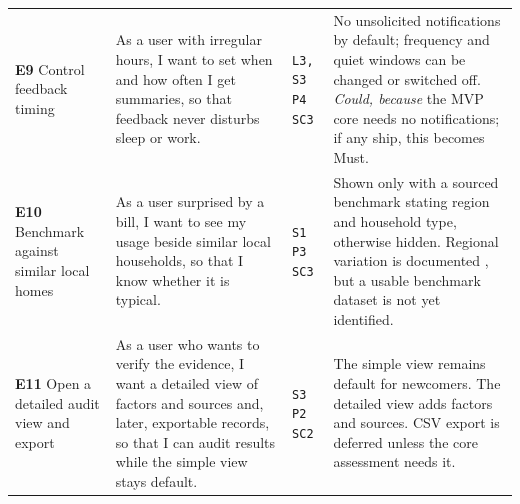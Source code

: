 \documentclass[12pt, a4paper]{article}
\begin{document}
{\begin{longtable}{|>{\raggedright\arraybackslash}p{2.6cm}|>{\raggedright\arraybackslash}p{5.1cm}|>{\raggedright\arraybackslash}p{3.0cm}|>{\raggedright\arraybackslash}p{4.9cm}|}
\rowcolor{cPlum}\multicolumn{4}{|l|}{\textcolor{white}{\textbf{COULD HAVE: depth and personalisation}}} \\
\hline
\textbf{E9} Control feedback timing &
As a user with irregular hours, I want to set when and how often I get summaries, so that feedback never disturbs sleep or work. &
\texttt{L3, S3} \newline \texttt{P4} \newline \texttt{SC3} &
No unsolicited notifications by default; frequency and quiet windows can be changed or switched off. \emph{Could, because} the MVP core needs no notifications; if any ship, this becomes Must. \\
\hline
\textbf{E10} Benchmark against similar local homes &
As a user surprised by a bill, I want to see my usage beside similar local households, so that I know whether it is typical. &
\texttt{S1} \newline \texttt{P3} \newline \texttt{SC3} &
Shown only with a sourced benchmark stating region and household type, otherwise hidden. Regional variation is documented \cite{lee2021}, but a usable benchmark dataset is not yet identified. \\
\hline
\textbf{E11} Open a detailed audit view and export &
As a user who wants to verify the evidence, I want a detailed view of factors and sources and, later, exportable records, so that I can audit results while the simple view stays default. &
\texttt{S3} \newline \texttt{P2} \newline \texttt{SC2} &
The simple view remains default for newcomers. The detailed view adds factors and sources. CSV export is deferred unless the core assessment needs it. \\
\hline


\end{longtable}}
\end{document}
